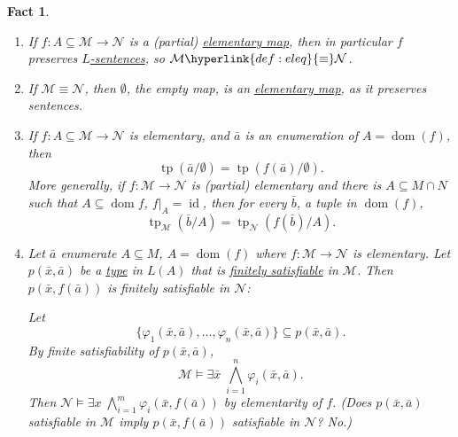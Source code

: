 \documentclass{article}
\let\models\vDash
\DeclareMathOperator{\dom}{dom}
\DeclareMathOperator{\tp}{tp}
\newtheorem{nfact}[nthm]{Fact}
\begin{document}
\begin{nfact}\label{fact:6.4}\leavevmode
  \begin{enumerate}[label=(\roman*)]
    \item If $f: A \subseteq \mathcal{M} \to \mathcal{N}$ is a (partial) \hyperlink{def:elmap}{elementary map}, then in particular $f$ preserves \hyperlink{def:sentence}{$L$-sentences}, so $\mathcal{M} \hyperlink{def:eleq}{\equiv} \mathcal{N}$.
    \item If $\mathcal{M} \equiv \mathcal{N}$, then $\emptyset$, the empty map, is an \hyperlink{def:el}{elementary map}, as it preserves sentences.
    \item If $f: A \subseteq \mathcal{M} \to \mathcal{N}$ is elementary, and $\bar{a}$ is an enumeration of $A = \dom(f)$, then
      \begin{equation*}
        \tp(\bar{a}/\emptyset) = \tp(f(\bar{a})/\emptyset).
      \end{equation*}
      More generally, if $f: \mathcal{M} \to \mathcal{N}$ is (partial) elementary and there is $A \subseteq M \cap N$ such that $A \subseteq \dom f$, $f|_A = \operatorname{id}$, then for every $\bar{b}$, a tuple in $\dom(f)$,
      \begin{equation*}
        \tp_\mathcal{M}(\bar{b}/A) = \tp_{\mathcal{N}}(f(\bar{b})/A).
      \end{equation*}
    \item Let $\bar{a}$ enumerate $A \subseteq M$, $A = \dom(f)$ where $f: \mathcal{M} \to \mathcal{N}$ is elementary.
      Let $p(\bar{x},\bar{a})$ be a \hyperlink{def:type}{type} in $L(A)$ that is \hyperlink{def:type}{finitely satisfiable} in $\mathcal{M}$.
      Then $p(\bar{x},f(\bar{a}))$ is finitely satisfiable in $\mathcal{N}$:

      Let
      \begin{equation*}\{\varphi_1(\bar{x},\bar{a}), \dotsc, \varphi_n(\bar{x},\bar{a})\} \subseteq p(\bar{x},\bar{a}).\end{equation*}
      By finite satisfiability of $p(\bar{x},\bar{a})$,
    \begin{equation*}\mathcal{M} \models \exists \bar{x} \; \bigwedge_{i=1}^n \varphi_i(\bar{x},\bar{a}).\end{equation*}
      Then $\mathcal{N} \models \exists x \; \bigwedge_{i=1}^m \varphi_i(\bar{x},f(\bar{a}))$ by elementarity of $f$.
      (Does $p(\bar{x},\bar{a})$ satisfiable in $\mathcal{M}$ imply $p(\bar{x},f(\bar{a}))$ satisfiable in $\mathcal{N}$? No.)
  \end{enumerate}
\end{nfact}
\end{document}
